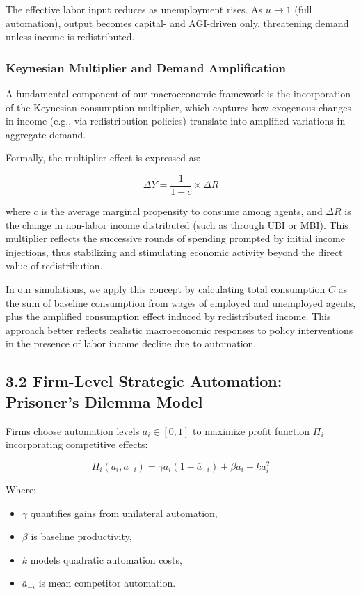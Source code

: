 \documentclass[11pt]{amsart}
\begin{document}
The effective labor input reduces as unemployment rises. As $u \to 1$ (full automation), output becomes capital- and AGI-driven only, threatening demand unless income is redistributed.


\hypertarget{x-keynesian-multiplier-and-demand-amplification}{\subsubsection{Keynesian Multiplier and Demand Amplification}}
A fundamental component of our macroeconomic framework is the incorporation of the Keynesian consumption multiplier, which captures how exogenous changes in income (e.g., via redistribution policies) translate into amplified variations in aggregate demand.


Formally, the multiplier effect is expressed as:


\[
\Delta Y = \frac{1}{1 - c} \times \Delta R
\]

where $c$ is the average marginal propensity to consume among agents, and $\Delta R$ is the change in non-labor income distributed (such as through UBI or MBI). This multiplier reflects the successive rounds of spending prompted by initial income injections, thus stabilizing and stimulating economic activity beyond the direct value of redistribution.


In our simulations, we apply this concept by calculating total consumption $C$ as the sum of baseline consumption from wages of employed and unemployed agents, plus the amplified consumption effect induced by redistributed income. This approach better reflects realistic macroeconomic responses to policy interventions in the presence of labor income decline due to automation.


\hypertarget{x-3.2-firm-level-strategic-automation:-prisoner’s-dilemma-model}{\subsection{3.2 Firm-Level Strategic Automation: Prisoner’s Dilemma Model}}
Firms choose automation levels $a_i \in [0,1]$ to maximize profit function $\Pi_i$ incorporating competitive effects:


\[
\Pi_i(a_i, a_{-i}) = \gamma a_i (1 - \bar{a}_{-i}) + \beta a_i - k a_i^2
\]

Where:


\begin{itemize}

\item $\gamma$ quantifies gains from unilateral automation,

\item $\beta$ is baseline productivity,

\item $k$ models quadratic automation costs,

\item $\bar{a}_{-i}$ is mean competitor automation.

\end{itemize}
\end{document}
